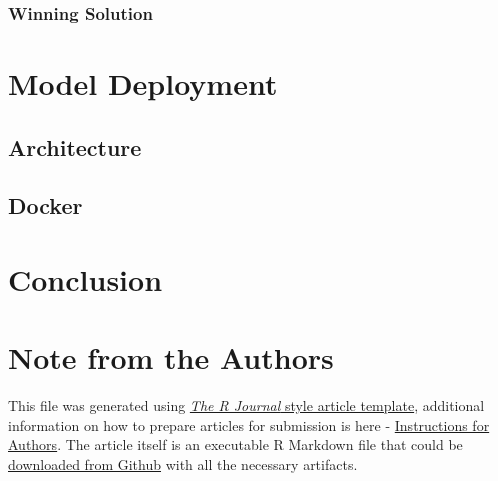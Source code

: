 \hypertarget{winning-solution-1}{%
\subsubsection{Winning Solution}\label{winning-solution-1}}

\hypertarget{model-deployment}{%
\section{Model Deployment}\label{model-deployment}}

\hypertarget{architecture}{%
\subsection{Architecture}\label{architecture}}

\hypertarget{docker}{%
\subsection{Docker}\label{docker}}

\hypertarget{conclusion}{%
\section{Conclusion}\label{conclusion}}



\hypertarget{note-from-the-authors}{%
\section{Note from the Authors}\label{note-from-the-authors}}

This file was generated using
\href{https://github.com/rstudio/rticles}{\emph{The R Journal} style
article template}, additional information on how to prepare articles for
submission is here -
\href{https://journal.r-project.org/share/author-guide.pdf}{Instructions
for Authors}. The article itself is an executable R Markdown file that
could be
\href{https://github.com/ivbsoftware/big-data-final-2/blob/master/docs/R_Journal/big-data-final-2/}{downloaded
from Github} with all the necessary artifacts.


\address{%
Vadim Spirkov\\
York University School of Continuing Studies\\
\\
}


\address{%
Murlidhar Loka\\
York University School of Continuing Studies\\
\\
}


